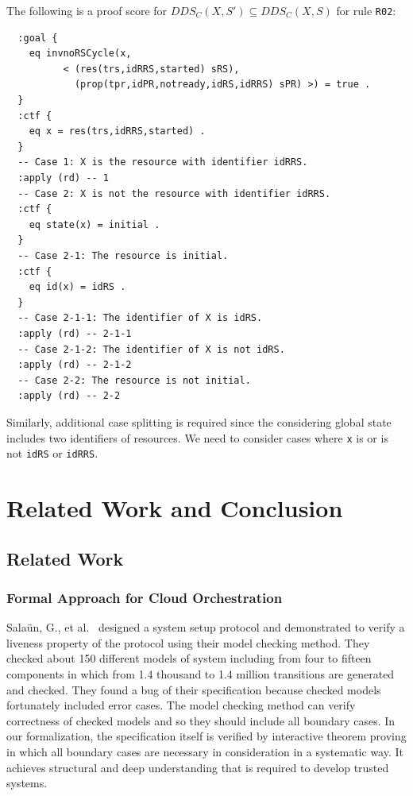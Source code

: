 \documentclass[12pt]{report}
\begin{document}
The following is a proof score for $DDS_C(X,S')\subseteq DDS_C(X,S)$ for
rule {\tt R02}:
\small
\begin{verbatim}
  :goal {
    eq invnoRSCycle(x,
          < (res(trs,idRRS,started) sRS), 
            (prop(tpr,idPR,notready,idRS,idRRS) sPR) >) = true .
  }
  :ctf {
    eq x = res(trs,idRRS,started) .
  }
  -- Case 1: X is the resource with identifier idRRS.
  :apply (rd) -- 1
  -- Case 2: X is not the resource with identifier idRRS.
  :ctf {
    eq state(x) = initial .
  }
  -- Case 2-1: The resource is initial.
  :ctf {
    eq id(x) = idRS .
  }
  -- Case 2-1-1: The identifier of X is idRS.
  :apply (rd) -- 2-1-1
  -- Case 2-1-2: The identifier of X is not idRS.
  :apply (rd) -- 2-1-2
  -- Case 2-2: The resource is not initial.
  :apply (rd) -- 2-2
\end{verbatim}
\normalsize
Similarly, additional case splitting is required since the considering
global state includes two identifiers of resources. We need to
consider cases where {\tt x} is or is not {\tt idRS} or {\tt idRRS}.

\chapter{Related Work and Conclusion}
\label{chap:conclusion}
\section{Related Work}
\subsection{Formal Approach for Cloud Orchestration}
Sala{\"u}n, G., et
al.~\cite{EtcheversCBP11,SalaunBCPEG13,SalaunEPBC13} designed a system
setup protocol and demonstrated to verify a liveness property of the
protocol using their model checking method. They checked about 150
different models of system including from four to fifteen components
in which from 1.4 thousand to 1.4 million transitions are generated
and checked. They found a bug of their specification because checked
models fortunately included error cases. The model checking method can
verify correctness of checked models and so they should include all
boundary cases. In our formalization, the specification itself is
verified by interactive theorem proving in which all boundary cases
are necessary in consideration in a systematic way. It achieves
structural and deep understanding that is required to develop trusted
systems.
\end{document}
